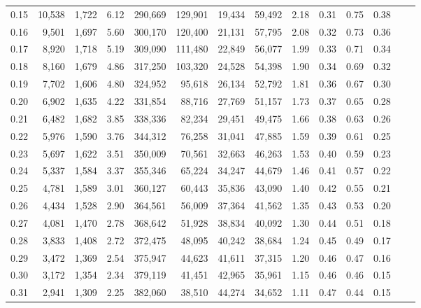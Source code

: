 \begin{tabular}{rrrrrrrrrrrrrr}
0.15 &  10,538 &  1,722 &    6.12 &  290,669 &  129,901 &  19,434 &  59,492 &  2.18 &  0.31 &  0.75 &      0.38 \\
0.16 &   9,501 &  1,697 &    5.60 &  300,170 &  120,400 &  21,131 &  57,795 &  2.08 &  0.32 &  0.73 &      0.36 \\
0.17 &   8,920 &  1,718 &    5.19 &  309,090 &  111,480 &  22,849 &  56,077 &  1.99 &  0.33 &  0.71 &      0.34 \\
0.18 &   8,160 &  1,679 &    4.86 &  317,250 &  103,320 &  24,528 &  54,398 &  1.90 &  0.34 &  0.69 &      0.32 \\
0.19 &   7,702 &  1,606 &    4.80 &  324,952 &   95,618 &  26,134 &  52,792 &  1.81 &  0.36 &  0.67 &      0.30 \\
0.20 &   6,902 &  1,635 &    4.22 &  331,854 &   88,716 &  27,769 &  51,157 &  1.73 &  0.37 &  0.65 &      0.28 \\
0.21 &   6,482 &  1,682 &    3.85 &  338,336 &   82,234 &  29,451 &  49,475 &  1.66 &  0.38 &  0.63 &      0.26 \\
0.22 &   5,976 &  1,590 &    3.76 &  344,312 &   76,258 &  31,041 &  47,885 &  1.59 &  0.39 &  0.61 &      0.25 \\
0.23 &   5,697 &  1,622 &    3.51 &  350,009 &   70,561 &  32,663 &  46,263 &  1.53 &  0.40 &  0.59 &      0.23 \\
0.24 &   5,337 &  1,584 &    3.37 &  355,346 &   65,224 &  34,247 &  44,679 &  1.46 &  0.41 &  0.57 &      0.22 \\
0.25 &   4,781 &  1,589 &    3.01 &  360,127 &   60,443 &  35,836 &  43,090 &  1.40 &  0.42 &  0.55 &      0.21 \\
0.26 &   4,434 &  1,528 &    2.90 &  364,561 &   56,009 &  37,364 &  41,562 &  1.35 &  0.43 &  0.53 &      0.20 \\
0.27 &   4,081 &  1,470 &    2.78 &  368,642 &   51,928 &  38,834 &  40,092 &  1.30 &  0.44 &  0.51 &      0.18 \\
0.28 &   3,833 &  1,408 &    2.72 &  372,475 &   48,095 &  40,242 &  38,684 &  1.24 &  0.45 &  0.49 &      0.17 \\
0.29 &   3,472 &  1,369 &    2.54 &  375,947 &   44,623 &  41,611 &  37,315 &  1.20 &  0.46 &  0.47 &      0.16 \\
0.30 &   3,172 &  1,354 &    2.34 &  379,119 &   41,451 &  42,965 &  35,961 &  1.15 &  0.46 &  0.46 &      0.15 \\
0.31 &   2,941 &  1,309 &    2.25 &  382,060 &   38,510 &  44,274 &  34,652 &  1.11 &  0.47 &  0.44 &      0.15 \\

\end{tabular}
